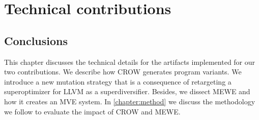 \chapter{Technical contributions}
\label{chapter:technical}










\section*{Conclusions}

This chapter discusses the technical details for the artifacts implemented for our two contributions.
We describe how CROW generates program variants.
We introduce a new mutation strategy that is a consequence of retargeting a superoptimizer for LLVM as a superdiversifier.
Besides, we dissect MEWE and how it creates an MVE system.
In \autoref{chapter:method} we discuss the methodology we follow to evaluate the impact of CROW and MEWE.